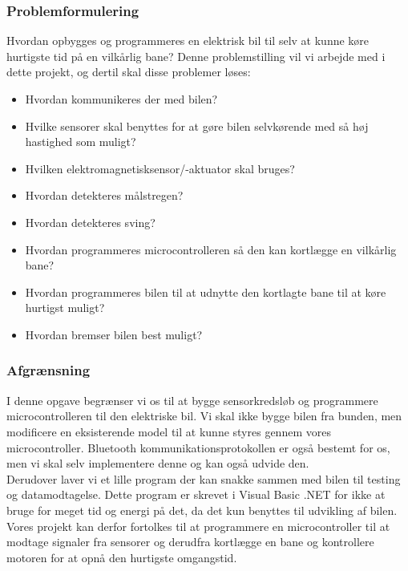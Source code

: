 \subsubsection{Problemformulering}
\label{problemformulering}
Hvordan opbygges og programmeres en elektrisk bil til selv at kunne køre hurtigste tid på en vilkårlig bane? Denne problemstilling vil vi arbejde med i dette projekt, og dertil skal disse problemer løses: \\

\begin{itemize}
\item Hvordan kommunikeres der med bilen?
\item Hvilke sensorer skal benyttes for at gøre bilen selvkørende med så høj hastighed som muligt?
\item Hvilken elektromagnetisksensor/-aktuator skal bruges?
\item Hvordan detekteres målstregen?
\item Hvordan detekteres sving?
\item Hvordan programmeres microcontrolleren så den kan kortlægge en vilkårlig bane?
\item Hvordan programmeres bilen til at udnytte den kortlagte bane til at køre hurtigst muligt?
\item Hvordan bremser bilen best muligt?
\end{itemize}

\subsubsection{Afgrænsning}
I denne opgave begrænser vi os til at bygge sensorkredsløb og programmere microcontrolleren til den elektriske bil. Vi skal ikke bygge bilen fra bunden, men modificere en eksisterende model til at kunne styres gennem vores microcontroller. Bluetooth kommunikationsprotokollen er også bestemt for os, men vi skal selv implementere denne og kan også udvide den. \\

Derudover laver vi et lille program der kan snakke sammen med bilen til testing og datamodtagelse. Dette program er skrevet i Visual Basic .NET for ikke at bruge for meget tid og energi på det, da det kun benyttes til udvikling af bilen. \\

Vores projekt kan derfor fortolkes til at programmere en microcontroller til at modtage signaler fra sensorer og derudfra kortlægge en bane og kontrollere motoren for at opnå den hurtigste omgangstid. 


